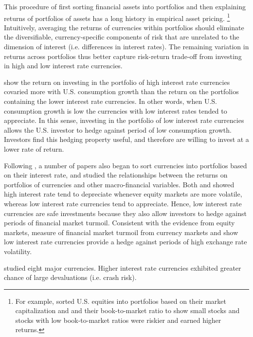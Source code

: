 \documentclass[12pt,letter]{article}
\theoremstyle{break} \theorembodyfont{\normalfont\itshape}
\theoremstyle{break}
\theoremstyle{break} \theorembodyfont{\normalfont\itshape}
\theoremstyle{break} \theorembodyfont{\normalfont\itshape}
\begin{document}
This procedure of first sorting financial assets into portfolios and then
explaining returns of portfolios of assets has a long history in empirical 
asset pricing. \footnote{For example, \citet{FamaFrench1992} sorted 
U.S. equities into portfolios based on their market capitalization and 
and their book-to-market ratio to show small stocks and stocks with low
book-to-market ratios were riskier and earned higher returns.} Intuitively, 
averaging the returns of currencies within portfolios should eliminate the
diversifiable, currency-specific components of risk that are unrelated
to the dimension of interest (i.e. differences in interest rates). The 
remaining variation in returns across portfolios thus better capture 
risk-return trade-off from investing in high and low interest rate 
currencies.

\citet{LustigVerdelhan2007} show the return on investing in the portfolio 
of high interest rate currencies covaried more with U.S. consumption growth 
than the return on the portfolios containing the lower interest rate currencies. 
In other words, when U.S. consumption growth is low the currencies with low 
interest rates tended to appreciate. In this sense, investing in the portfolio 
of low interest rate currencies allows the U.S. investor to hedge against period 
of low consumption growth. Investors find this hedging property useful, and 
therefore are willing to invest at a lower rate of return. 

Following \citet{LustigVerdelhan2007}, a number of papers also began to sort 
currencies into portfolios based on their interest rate, and studied the 
relationships between the returns on portfolios of currencies and other 
macro-financial variables. Both \citet{CampbellMeideirosViceira2010} and 
\citet{LustigRoussanovVerdelhan2011} showed high interest rate tend
to depreciate whenever equity markets are more volatile, whereas low
interest rate currencies tend to appreciate. Hence, low interest rate
currencies are safe investments because they also allow investors to hedge
against periods of financial market turmoil. Consistent with the evidence
from equity markets, \citet{MenkhoffSarnoSchmelingSchrimpf2012} measure of 
financial market turmoil from currency markets and show low interest rate
currencies provide a hedge against periods of high exchange rate volatility. 


\citet{BrunnermeierNagelPedersen2008} studied eight major currencies. Higher 
interest rate currencies exhibited greater chance of large devaluations (i.e. crash risk).
\end{document}
